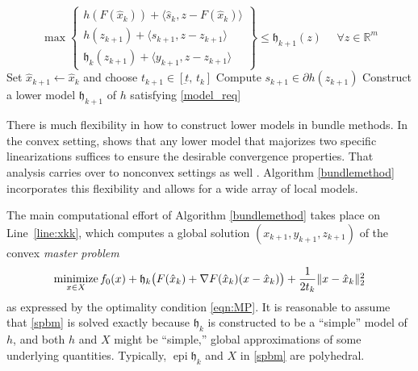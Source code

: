 \documentclass[smallextended,envcountsect]{svjour3}
\newcommand{\norm}[1]{\textstyle{\Vert} #1 \textstyle{\Vert}_2}
\newcommand{\inner}[2]{\langle#1,#2\rangle}
\newcommand{\epi}[1]{\operatorname{epi}#1}
\newcommand{\modelh}{\mathfrak{h}}
\newcommand{\reals}{\mathbb{R}}
\newcommand{\nnmin}{\mathop{\rm minimize}}
\begin{document}
\begin{algorithm}[htb]
\begin{algorithmic}[1]
{\begin{equation}\label{model_req}
\max\begin{Bmatrix}
h(F(\hat x_k))+\inner{\hat s_{k}}{z-F(\hat x_k)}\\
h(z_{k+1})+\inner{s_{k+1}}{z-z_{k+1}}\\
\modelh_k(z_{k+1}) + \inner{y_{k+1}}{z - z_{k+1} }
\end{Bmatrix}
 \leq \modelh_{k+1}(z)~~~~~~\forall z\in \reals^m
\end{equation} 
\EndIf
\Else
\State Set $ \hat x_{k+1}\gets \hat x_k$ and choose $t_{k+1}\in [\underbar{t},\, t_k]$ \label{NS}  
\State Compute $s_{k+1} \in \partial h(z_{k+1})$
\State Construct a lower model $\modelh_{k+1}$ of $h$ satisfying \eqref{model_req}
\EndIf
\EndFor
}
  \end{algorithmic}
\end{algorithm}

There is much flexibility in how to construct lower models in bundle methods. In the convex setting, \cite{Correa_Lemarechal_1993} shows that any lower model that majorizes two specific linearizations suffices to ensure the desirable convergence properties. That analysis carries over to nonconvex settings as well \cite{Hare_Sagastizabal_2010,Oliveira_2019}. Algorithm \ref{bundlemethod} incorporates this flexibility and allows for a wide array of local models. 


The main computational effort of Algorithm \ref{bundlemethod} takes place on Line~\ref{line:xkk}, which computes a global solution $(x_{k+1}, y_{k+1}, z_{k+1})$ of the convex {\em master problem} 
\begin{equation}\label{spbm}
\nnmin_{x\in X} f_0(x) + \modelh_k\big(F(\hat x_k)+\nabla F(\hat x_k)(x-\hat x_k)\big) + \frac{1}{2t_k}\norm{x-\hat x_k}^2
\end{equation} 
as expressed by the optimality condition \eqref{eqn:MP}. It is reasonable to assume that \eqref{spbm} is solved exactly because $\modelh_k$ is constructed to be a ``simple'' model of $h$, and both $h$ and $X$ might be ``simple,'' global approximations of some underlying quantities. Typically, $\epi \modelh_k$ and $X$ in \eqref{spbm} are polyhedral. 
\end{document}
